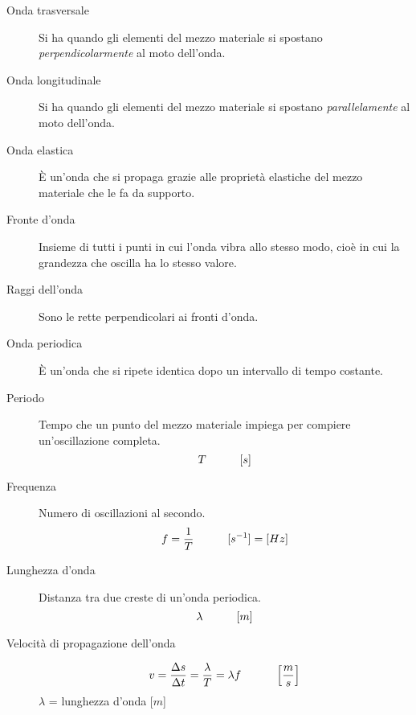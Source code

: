 \documentclass[a4paper,11pt,italian]{article}
\begin{document}
\begin{description}
  \item[Onda trasversale] 
  Si ha quando gli elementi del mezzo materiale si spostano \emph{perpendicolarmente} al moto dell'onda.
  
  \item[Onda longitudinale] 
  Si ha quando gli elementi del mezzo materiale si spostano \emph{parallelamente} al moto dell'onda.
  
  \item[Onda elastica] 
  È un'onda che si propaga grazie alle proprietà elastiche del mezzo materiale che le fa da supporto.
  
  \item[Fronte d'onda] 
  Insieme di tutti i punti in cui l'onda vibra allo stesso modo, cioè in cui la grandezza che oscilla ha lo stesso valore.
  
  \item[Raggi dell'onda] 
  Sono le rette perpendicolari ai fronti d'onda.
  
  \item[Onda periodica] 
  È un'onda che si ripete identica dopo un intervallo di tempo costante.
  
  \item[Periodo] 
  Tempo che un punto del mezzo materiale impiega per compiere un'oscillazione completa.
  \[ T \hspace*{3em} [s] \]
  
  \item[Frequenza] 
  Numero di oscillazioni al secondo.
  \[ f = \frac{1}{T} \hspace*{3em} [s^{-1}]=[ Hz] \]
  

  \item[Lunghezza d'onda] Distanza tra due creste di un'onda periodica.
  \[ \lambda \hspace*{3em} [m] \]
  
  \item[Velocità di propagazione dell'onda] 
  \[ v = \frac{\Delta s}{\Delta t} = \frac{\lambda}{T} = \lambda f \hspace*{3em} \left[ \frac{m}{s} \right] \]
  $ \lambda $ = lunghezza d'onda [$ m $]
  
  

\end{description}
\end{document}
